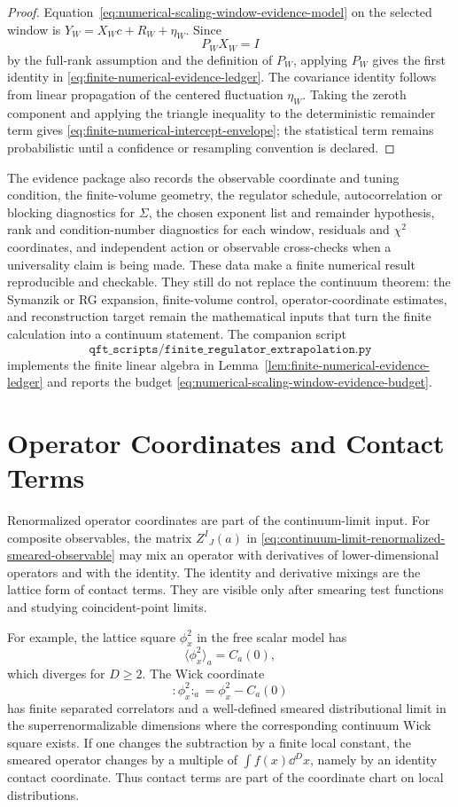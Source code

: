 \begin{proof}
Equation~\eqref{eq:numerical-scaling-window-evidence-model} on the selected
window is \(Y_W=X_Wc+R_W+\eta_W\).  Since
\[
  P_WX_W=I
\]
by the full-rank assumption and the definition of \(P_W\), applying \(P_W\)
gives the first identity in
\eqref{eq:finite-numerical-evidence-ledger}.  The covariance identity follows
from linear propagation of the centered fluctuation \(\eta_W\).  Taking the
zeroth component and applying the triangle inequality to the deterministic
remainder term gives
\eqref{eq:finite-numerical-intercept-envelope}; the statistical term remains
probabilistic until a confidence or resampling convention is declared.
\end{proof}

The evidence package also records the observable coordinate and tuning
condition, the finite-volume geometry, the regulator schedule, autocorrelation
or blocking diagnostics for \(\Sigma\), the chosen exponent list and
remainder hypothesis, rank and condition-number diagnostics for each window,
residuals and \(\chi^2\) coordinates, and independent action or observable
cross-checks when a universality claim is being made.  These data make a
finite numerical result reproducible and checkable.  They still do not
replace the continuum theorem: the Symanzik or RG expansion, finite-volume
control, operator-coordinate estimates, and reconstruction target remain the
mathematical inputs that turn the finite calculation into a continuum statement.
The companion script
\[
  \texttt{qft\_scripts/finite\_regulator\_extrapolation.py}
\]
implements the finite linear algebra in
Lemma~\ref{lem:finite-numerical-evidence-ledger} and reports the budget
\eqref{eq:numerical-scaling-window-evidence-budget}.

\section{Operator Coordinates and Contact Terms}

Renormalized operator coordinates are part of the continuum-limit input.
For composite observables, the matrix \(Z^I{}_J(a)\) in
\eqref{eq:continuum-limit-renormalized-smeared-observable} may mix an
operator with derivatives of lower-dimensional operators and with the
identity.  The identity and derivative mixings are the lattice form of
contact terms.  They are visible only after smearing test functions and
studying coincident-point limits.

For example, the lattice square \(\phi_x^2\) in the free scalar model has
\[
  \langle\phi_x^2\rangle_a=C_a(0),
\]
which diverges for \(D\ge2\).  The Wick coordinate
\[
  :\!\phi_x^2\!:_a=\phi_x^2-C_a(0)
\]
has finite separated correlators and a well-defined smeared distributional
limit in the superrenormalizable dimensions where the corresponding
continuum Wick square exists.  If one changes the subtraction by a finite
local constant, the smeared operator changes by a multiple of
\(\int f(x)\dd^Dx\), namely by an identity contact coordinate.  Thus contact
terms are part of the coordinate chart on
local distributions.

